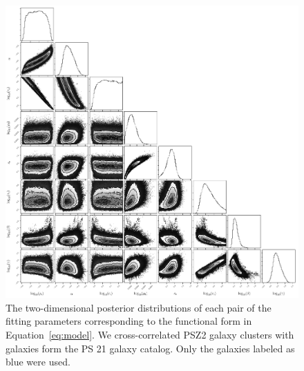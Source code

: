 \documentclass[iop, apjl, twocolappendix, numberedappendix]{emulateapj}
\begin{document}
\begin{figure}
    \includegraphics[width= \textwidth]{cornerblue.pdf}
\caption{The two-dimensional posterior distributions of each pair of
the fitting parameters corresponding to the functional
form in Equation~\ref{eq:model}. We cross-correlated PSZ2 galaxy clusters with
galaxies form the PS 21 galaxy catalog. Only the galaxies labeled as
blue were used.}
   \label{fig:cornerblue} 
\end{figure}

\label{lastpage}
\end{document}
